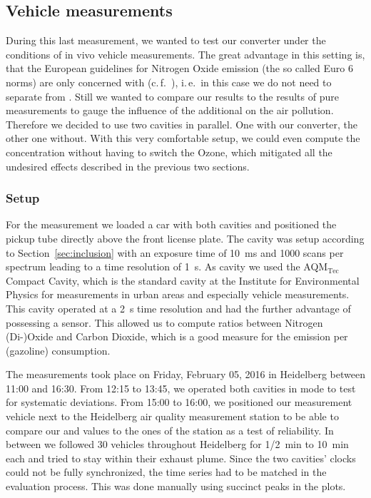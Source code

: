\subsection{Vehicle measurements}
\label{sec:vehicle}

During this last measurement, we wanted to test our converter under
the conditions of in vivo vehicle measurements. The great advantage in
this setting is, that the European guidelines for Nitrogen Oxide
emission (the so called Euro 6 norms) are only concerned with 
(c.\,f.~\cite{eu}), i.\,e.\ in this case we do not need to separate
 from . Still we wanted to compare our 
results to the results of pure  measurements to gauge the
influence of the additional  on the air pollution. Therefore we
decided to use two cavities in parallel. One with our converter, the
other one without. With this very comfortable setup, we could even
compute the  concentration without having to switch the Ozone,
which mitigated all the undesired effects described in the previous
two sections.

\subsubsection{Setup}
\label{sec:vehicle-setup}

For the measurement we loaded a car with both cavities
and positioned the pickup tube directly above the front license
plate. The  cavity was setup according to
Section~\ref{sec:inclusion} with an exposure time of
\SI{10}{\milli\second} and 1000 scans per spectrum leading to a time
resolution of \SI{1}{\second}. As  cavity we used the
AQM$_{\text{Tec}}$ Compact Cavity, which is the standard cavity at the
Institute for Environmental Physics for  measurements in urban
areas and especially vehicle measurements. This cavity operated at a
\SI{2}{\second} time resolution and had the further advantage of
possessing a  sensor. This allowed us to compute ratios
between Nitrogen (Di-)Oxide and Carbon Dioxide, which is a good
measure for the emission per (gazoline) consumption.

The measurements took place on Friday, February 05, 2016 in Heidelberg
between 11:00 and 16:30. From 12:15 to 13:45, we operated both
cavities in  mode to test for systematic deviations. From
15:00 to 16:00, we positioned our measurement vehicle next to the
Heidelberg air quality measurement station to be able to compare our
 and  values to the ones of the station as a test of
reliability. In between we followed 30 vehicles throughout
Heidelberg for {\nfrac{} 1/2}~\si{\minute} to \SI{10}{\minute} each
and tried to stay within their exhaust plume. Since the two cavities'
clocks could not be fully synchronized, the time series had to be
matched in the evaluation process. This was done manually using succinct
peaks in the plots.

